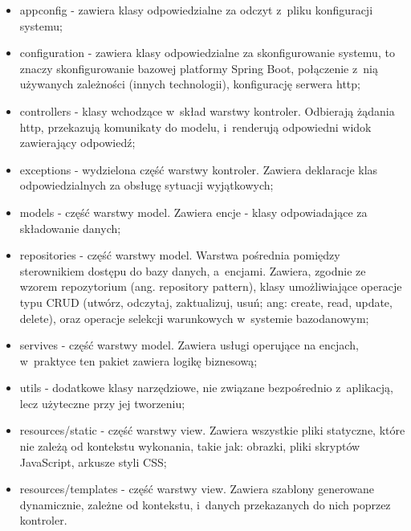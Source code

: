 \begin{itemize}

\item appconfig - zawiera klasy odpowiedzialne za odczyt z~pliku konfiguracji systemu; 

\item configuration - zawiera klasy odpowiedzialne za skonfigurowanie systemu, to znaczy skonfigurowanie bazowej platformy Spring Boot, połączenie z~nią używanych zależności (innych technologii), konfigurację serwera http;

\item controllers - klasy wchodzące w~skład warstwy kontroler. Odbierają żądania http, przekazują komunikaty do modelu, i~renderują odpowiedni widok zawierający odpowiedź;

\item exceptions - wydzielona część warstwy kontroler. Zawiera deklaracje klas odpowiedzialnych za obsługę sytuacji wyjątkowych;

\item models - część warstwy model. Zawiera encje - klasy odpowiadające za składowanie danych;

\item repositories - część warstwy model. Warstwa pośrednia pomiędzy sterownikiem dostępu do bazy danych, a~encjami. Zawiera, zgodnie ze wzorem repozytorium (ang. repository pattern), klasy umożliwiające operacje typu CRUD (utwórz, odczytaj, zaktualizuj, usuń; ang: create, read, update, delete), oraz operacje selekcji warunkowych w~systemie bazodanowym;

\item servives - część warstwy model. Zawiera usługi operujące na encjach, w~praktyce ten pakiet zawiera logikę biznesową;

\item utils - dodatkowe klasy narzędziowe, nie związane bezpośrednio z~aplikacją, lecz użyteczne przy jej tworzeniu;

\item resources/static - część warstwy view. Zawiera wszystkie pliki statyczne, które nie zależą od kontekstu wykonania, takie jak: obrazki, pliki skryptów JavaScript, arkusze styli CSS;

\item resources/templates - część warstwy view. Zawiera szablony generowane dynamicznie, zależne od kontekstu, i~danych przekazanych do nich poprzez kontroler.

\end{itemize}

